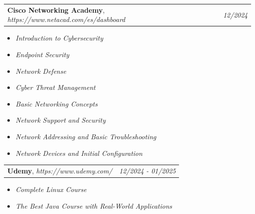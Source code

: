 \documentclass[letterpaper,12pt]{article}
\begin{document}
\noindent\begin{tabularx}{\textwidth}{Xr}
    \textbf{Cisco Networking Academy}, \textit{https://www.netacad.com/es/dashboard} & \textit{12/2024} \\
\end{tabularx}
\begin{itemize}[itemsep=0pt, topsep=5pt]
    \item \textit{Introduction to Cybersecurity}
    \item \textit{Endpoint Security}
    \item \textit{Network Defense}
    \item \textit{Cyber Threat Management}
    \item \textit{Basic Networking Concepts}
    \item \textit{Network Support and Security}
    \item \textit{Network Addressing and Basic Troubleshooting}
    \item \textit{Network Devices and Initial Configuration}
\end{itemize}

\noindent\begin{tabularx}{\textwidth}{Xr}
    \textbf{Udemy}, \textit{https://www.udemy.com/} & \textit{12/2024 - 01/2025} \\
\end{tabularx}
\begin{itemize}[itemsep=0pt, topsep=5pt]
    \item \textit{Complete Linux Course}
    \item \textit{The Best Java Course with Real-World Applications}
\end{itemize}
\end{document}
